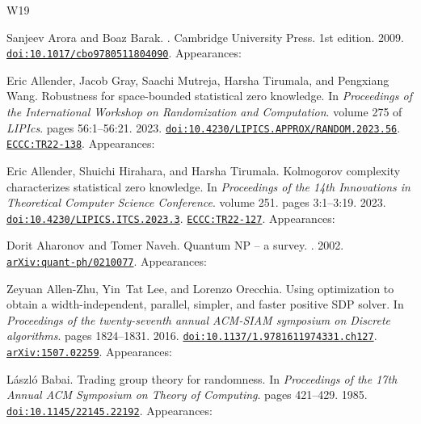 \documentclass[10pt,a4paper]{article}
\numberwithin{equation}{section}
\numberwithin{figure}{section}
\begin{document}
\begin{thebibliography}{{}W19}

Sanjeev Arora and Boaz Barak.
.
\newblock Cambridge University Press. 1st edition. 2009.
\newblock \href {https://doi.org/10.1017/cbo9780511804090} {\texttt{doi:10.1017/cbo9780511804090}}. Appearances:\!

Eric Allender, Jacob Gray, Saachi Mutreja, Harsha Tirumala, and Pengxiang Wang.
\newblock Robustness for space-bounded statistical zero knowledge.
\newblock In {\em Proceedings of the International Workshop on Randomization and Computation}. volume 275 of {\em LIPIcs}. pages 56:1--56:21. 2023.
\newblock \href {https://doi.org/10.4230/LIPICS.APPROX/RANDOM.2023.56} {\texttt{doi:10.4230/LIPICS.APPROX/RANDOM.2023.56}}. \href {https://eccc.weizmann.ac.il/report/2022/138} {\texttt{ECCC:TR22-138}}. Appearances:\!

Eric Allender, Shuichi Hirahara, and Harsha Tirumala.
\newblock Kolmogorov complexity characterizes statistical zero knowledge.
\newblock In {\em Proceedings of the 14th Innovations in Theoretical Computer Science Conference}. volume 251. pages 3:1--3:19. 2023.
\newblock \href {https://doi.org/10.4230/LIPICS.ITCS.2023.3} {\texttt{doi:10.4230/LIPICS.ITCS.2023.3}}. \href {https://eccc.weizmann.ac.il/report/2022/127} {\texttt{ECCC:TR22-127}}. Appearances:\!

Dorit Aharonov and Tomer Naveh.
\newblock Quantum {NP} -- a survey.
. 2002.
\newblock \href {https://arxiv.org/abs/quant-ph/0210077} {\texttt{arXiv:quant-ph/0210077}}. Appearances:\!

Zeyuan Allen-Zhu, Yin~Tat Lee, and Lorenzo Orecchia.
\newblock Using optimization to obtain a width-independent, parallel, simpler, and faster positive {SDP} solver.
\newblock In {\em Proceedings of the twenty-seventh annual ACM-SIAM symposium on Discrete algorithms}. pages 1824--1831. 2016.
\newblock \href {https://doi.org/10.1137/1.9781611974331.ch127} {\texttt{doi:10.1137/1.9781611974331.ch127}}. \href {https://arxiv.org/abs/1507.02259} {\texttt{arXiv:1507.02259}}. Appearances:\!

L{\'a}szl{\'o} Babai.
\newblock Trading group theory for randomness.
\newblock In {\em Proceedings of the 17th Annual ACM Symposium on Theory of Computing}. pages 421--429. 1985.
\newblock \href {https://doi.org/10.1145/22145.22192} {\texttt{doi:10.1145/22145.22192}}. Appearances:\!


\end{thebibliography}
\end{document}
